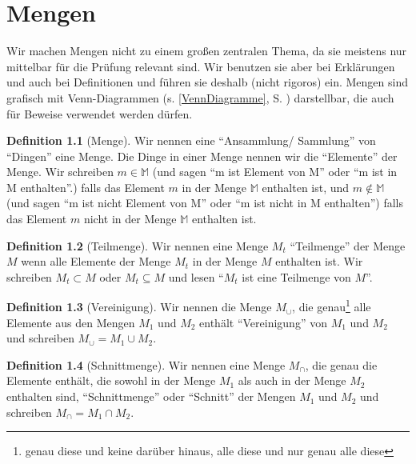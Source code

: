 \documentclass[a4paper]{book}%
\theoremstyle{definition}
\newtheorem{definition}{Definition}
\begin{document}
\chapter{Mengen}\label{chapter:Mengen}

Wir machen Mengen nicht zu einem großen zentralen Thema, da sie meistens nur mittelbar für die Prüfung relevant sind. Wir benutzen sie aber bei Erklärungen und auch bei Definitionen und führen sie deshalb (nicht rigoros) ein. Mengen sind grafisch mit Venn-Diagrammen (s. \ref{VennDiagramme}, S. \pageref{VennDiagramme}) darstellbar, die auch für Beweise verwendet werden dürfen.

\begin{definition}[Menge]
    Wir nennen eine \enquote{Ansammlung/ Sammlung} von \enquote{Dingen} eine Menge. Die Dinge in einer Menge nennen wir die \enquote{Elemente} der Menge. Wir schreiben $m \in \mathbb{M}$ (und sagen \enquote{m ist Element von M} oder \enquote{m ist in M enthalten}.) falls das Element $m$ in der Menge $\mathbb{M}$ enthalten ist, und $m \notin \mathbb{M}$ (und sagen \enquote{m ist nicht Element von M} oder \enquote{m ist nicht in M enthalten}) falls das Element $m$ nicht in der Menge $\mathbb{M}$ enthalten ist.
\end{definition}

\begin{definition}[Teilmenge]
    Wir nennen eine Menge $M_t$ \enquote{Teilmenge} der Menge $M$ wenn alle Elemente der Menge $M_t$ in der Menge $M$ enthalten ist. Wir schreiben $M_t \subset M$ oder $M_t \subseteq M$ und lesen \enquote{$M_t$ ist eine Teilmenge von $M$}.
\end{definition}

\begin{definition}[Vereinigung]
    Wir nennen die Menge $M_\cup$, die genau\footnote{genau diese und keine darüber hinaus, alle diese und nur genau alle diese} alle Elemente aus den Mengen $M_1$ und $M_2$ enthält \enquote{Vereinigung} von $M_1$ und $M_2$ und schreiben $M_\cup = M_1 \cup M_2$.
\end{definition}

\begin{definition}[Schnittmenge]
    Wir nennen eine Menge $M_\cap$, die genau die Elemente enthält, die sowohl in der Menge $M_1$ als auch in der Menge $M_2$ enthalten sind, \enquote{Schnittmenge} oder \enquote{Schnitt} der Mengen $M_1$ und $M_2$ und schreiben $M_\cap = M_1 \cap M_2$.
\end{definition}
\end{document}
